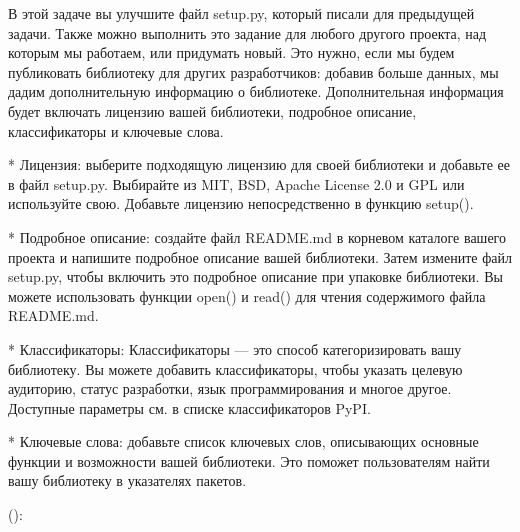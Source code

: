 \documentclass[letterpaper,10pt,russian]{sphinxmanual}
\begin{document}
\sphinxAtStartPar
В этой задаче вы улучшите файл setup.py, который писали для предыдущей задачи. Также можно выполнить это задание для любого другого проекта, над которым мы работаем, или придумать новый. Это нужно, если мы будем публиковать библиотеку для других разработчиков: добавив больше данных, мы дадим дополнительную информацию о библиотеке. Дополнительная информация будет включать лицензию вашей библиотеки, подробное описание, классификаторы и ключевые слова.

\begin{sphinxVerbatim}[commandchars=\\\{\}]
* Лицензия: выберите подходящую лицензию для своей библиотеки и добавьте ее в файл setup.py. Выбирайте из MIT, BSD, Apache License 2.0 и GPL или используйте свою. Добавьте лицензию непосредственно в функцию setup().

* Подробное описание: создайте файл README.md в корневом каталоге вашего проекта и напишите подробное описание вашей библиотеки. Затем измените файл setup.py, чтобы включить это подробное описание при упаковке библиотеки. Вы можете использовать функции open() и read() для чтения содержимого файла README.md.

* Классификаторы: Классификаторы — это способ категоризировать вашу библиотеку. Вы можете добавить классификаторы, чтобы указать целевую аудиторию, статус разработки, язык программирования и многое другое. Доступные параметры см. в списке классификаторов PyPI.

* Ключевые слова: добавьте список ключевых слов, описывающих основные функции и возможности вашей библиотеки. Это поможет пользователям найти вашу библиотеку в указателях пакетов.
\end{sphinxVerbatim}

\sphinxAtStartPar
{}

\sphinxAtStartPar
():
\end{document}
